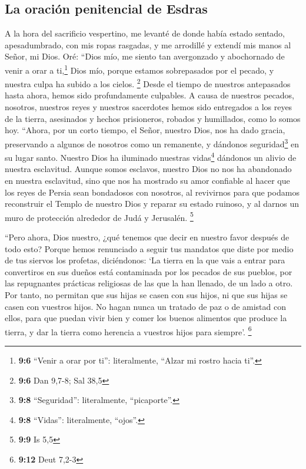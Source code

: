\hypertarget{la-oraciuxf3n-penitencial-de-esdras}{%
\subsection{La oración penitencial de
Esdras}\label{la-oraciuxf3n-penitencial-de-esdras}}

 A la hora del sacrificio vespertino, me levanté de donde
había estado sentado, apesadumbrado, con mis ropas rasgadas, y me
arrodillé y extendí mis manos al Señor, mi Dios.  Oré:
``Dios mío, me siento tan avergonzado y abochornado de venir a orar a
ti,\footnote{\textbf{9:6} ``Venir a orar por ti'': literalmente, ``Alzar
  mi rostro hacia ti''.} Dios mío, porque estamos sobrepasados por el
pecado, y nuestra culpa ha subido a los cielos. \footnote{\textbf{9:6}
  Dan 9,7-8; Sal 38,5}  Desde el tiempo de nuestros
antepasados hasta ahora, hemos sido profundamente culpables. A causa de
nuestros pecados, nosotros, nuestros reyes y nuestros sacerdotes hemos
sido entregados a los reyes de la tierra, asesinados y hechos
prisioneros, robados y humillados, como lo somos hoy. 
``Ahora, por un corto tiempo, el Señor, nuestro Dios, nos ha dado
gracia, preservando a algunos de nosotros como un remanente, y dándonos
seguridad\footnote{\textbf{9:8} ``Seguridad'': literalmente,
  ``picaporte''.} en su lugar santo. Nuestro Dios ha iluminado nuestras
vidas\footnote{\textbf{9:8} ``Vidas'': literalmente, ``ojos''.} dándonos
un alivio de nuestra esclavitud.  Aunque somos esclavos,
nuestro Dios no nos ha abandonado en nuestra esclavitud, sino que nos ha
mostrado su amor confiable al hacer que los reyes de Persia sean
bondadosos con nosotros, al revivirnos para que podamos reconstruir el
Templo de nuestro Dios y reparar su estado ruinoso, y al darnos un muro
de protección alrededor de Judá y Jerusalén. \footnote{\textbf{9:9} Is
  5,5}

 ``Pero ahora, Dios nuestro, ¿qué tenemos que decir en
nuestro favor después de todo esto? Porque hemos renunciado a seguir tus
mandatos  que diste por medio de tus siervos los
profetas, diciéndonos: `La tierra en la que vais a entrar para
convertiros en sus dueños está contaminada por los pecados de sus
pueblos, por las repugnantes prácticas religiosas de las que la han
llenado, de un lado a otro.  Por tanto, no permitan que
sus hijas se casen con sus hijos, ni que sus hijas se casen con vuestros
hijos. No hagan nunca un tratado de paz o de amistad con ellos, para que
puedan vivir bien y comer los buenos alimentos que produce la tierra, y
dar la tierra como herencia a vuestros hijos para siempre'. \footnote{\textbf{9:12}
  Deut 7,2-3}

